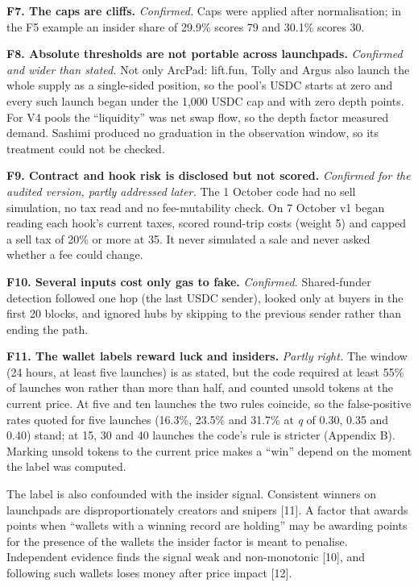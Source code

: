 \textbf{F7. The caps are cliffs.} \emph{Confirmed.} Caps were applied after normalisation; in the F5 example an insider share of 29.9\% scores 79 and 30.1\% scores 30.

\textbf{F8. Absolute thresholds are not portable across launchpads.} \emph{Confirmed and wider than stated.} Not only ArcPad: lift.fun, Tolly and Argus also launch the whole supply as a single-sided position, so the pool's USDC starts at zero and every such launch began under the 1,000 USDC cap and with zero depth points. For V4 pools the ``liquidity'' was net swap flow, so the depth factor measured demand. Sashimi produced no graduation in the observation window, so its treatment could not be checked.

\textbf{F9. Contract and hook risk is disclosed but not scored.} \emph{Confirmed for the audited version, partly addressed later.} The 1 October code had no sell simulation, no tax read and no fee-mutability check. On 7 October v1 began reading each hook's current taxes, scored round-trip costs (weight 5) and capped a sell tax of 20\% or more at 35. It never simulated a sale and never asked whether a fee could change.

\textbf{F10. Several inputs cost only gas to fake.} \emph{Confirmed.} Shared-funder detection followed one hop (the last USDC sender), looked only at buyers in the first 20 blocks, and ignored hubs by skipping to the previous sender rather than ending the path.

\textbf{F11. The wallet labels reward luck and insiders.} \emph{Partly right.} The window (24 hours, at least five launches) is as stated, but the code required at least 55\% of launches won rather than more than half, and counted unsold tokens at the current price. At five and ten launches the two rules coincide, so the false-positive rates quoted for five launches (16.3\%, 23.5\% and 31.7\% at \emph{q} of 0.30, 0.35 and 0.40) stand; at 15, 30 and 40 launches the code's rule is stricter (Appendix B). Marking unsold tokens to the current price makes a ``win'' depend on the moment the label was computed.



The label is also confounded with the insider signal. Consistent winners on launchpads are disproportionately creators and snipers {[}11{]}. A factor that awards points when ``wallets with a winning record are holding'' may be awarding points for the presence of the wallets the insider factor is meant to penalise. Independent evidence finds the signal weak and non-monotonic {[}10{]}, and following such wallets loses money after price impact {[}12{]}.

